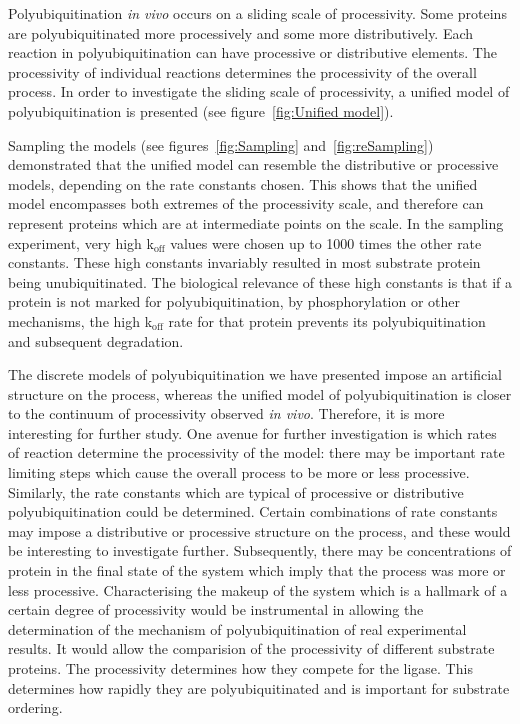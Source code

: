 \documentclass[11pt]{article}
\begin{document}
Polyubiquitination \emph{in vivo} occurs on a sliding scale of processivity\cite{rape2006processivity}. Some proteins are polyubiquitinated more processively and some more distributively.  Each reaction in polyubiquitination can have processive or distributive elements. The processivity of individual reactions determines the processivity of the overall process. In order to investigate the sliding scale of processivity, a unified model of polyubiquitination is presented (see figure~\ref{fig:Unified model}).

Sampling the models (see figures~\ref{fig:Sampling} and~\ref{fig:reSampling}) demonstrated that the unified model can resemble the distributive or processive models, depending on the rate constants chosen. This shows that the unified model encompasses both extremes of the processivity scale, and therefore can represent proteins which are at intermediate points on the scale. In the sampling experiment, very high k$_\text{off}$ values were chosen up to 1000 times the other rate constants. These high constants invariably resulted in most substrate protein being unubiquitinated. The biological relevance of these high constants is that if a protein is not marked for polyubiquitination, by phosphorylation or other mechanisms, the high k$_\text{off}$ rate for that protein prevents its polyubiquitination and subsequent degradation.

The discrete models of polyubiquitination we have presented impose an artificial structure on the process, whereas the unified model of polyubiquitination is closer to the continuum of processivity observed \emph{in vivo}. Therefore, it is more interesting for further study. One avenue for further investigation is which rates of reaction determine the processivity of the model: there may be important rate limiting steps which cause the overall process to be more or less processive. Similarly, the rate constants which are typical of processive or distributive polyubiquitination could be determined. Certain combinations of rate constants may impose a distributive or processive structure on the process, and these would be interesting to investigate further. Subsequently, there may be concentrations of protein in the final state of the system which imply that the process was more or less processive. Characterising the makeup of the system which is a hallmark of a certain degree of processivity would be instrumental in allowing the determination of the mechanism of polyubiquitination of real experimental results. It would allow the comparision of the processivity of different substrate proteins. The processivity determines how they compete for the ligase. This determines how rapidly they are polyubiquitinated and is important for substrate ordering.
\end{document}
